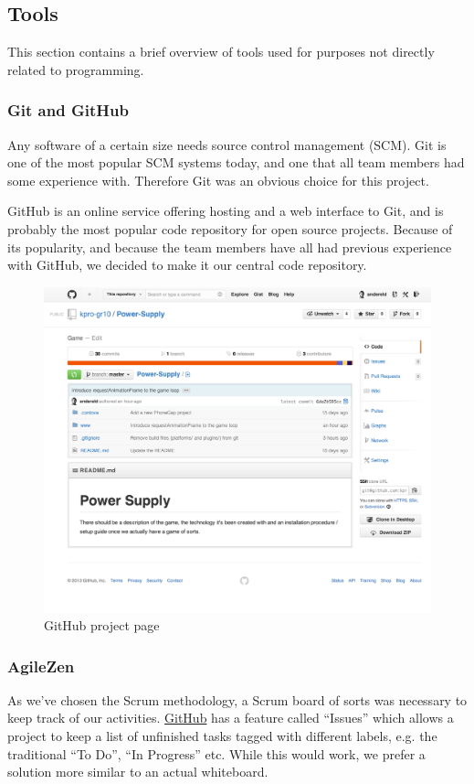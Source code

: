 \subsection{Tools}

This section contains a brief overview of tools used for purposes not
directly related to programming.

\subsubsection{Git and GitHub}
Any software of a certain size needs source control management (SCM). Git is
one of the most popular SCM systems today, and one that all team members had
some experience with. Therefore Git was an obvious choice for this project.

GitHub is an online service offering hosting and a web interface to Git, and is
probably the most popular code repository for open source projects. Because of
its popularity, and because the team members have all had previous experience
with GitHub, we decided to make it our central code repository.

\begin{figure}[htb]
  \centering
  \includegraphics[width=1\textwidth]{pictures/github.png}
  \caption{GitHub project page}
\end{figure}

\subsubsection{AgileZen}
As we've chosen the Scrum methodology, a Scrum board of sorts was necessary to
keep track of our activities. \href{https://github.com}{GitHub} has a
feature called ``Issues'' which allows a project to keep a list of unfinished
tasks tagged with different labels, e.g. the traditional ``To Do'', ``In
Progress'' etc. While this would work, we prefer a solution more similar to an
actual whiteboard.

